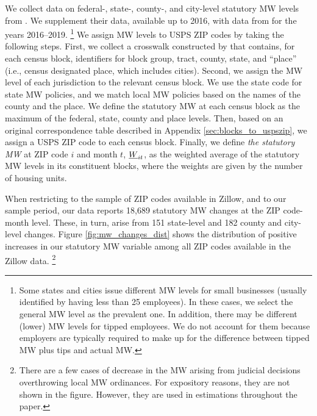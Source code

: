 We collect data on federal-, state-, county-, and city-level statutory MW levels 
from \textcite{VaghulZipperer2016}.
We supplement their data, available up to 2016, with data from 
\textcite{BerkeleyLaborCenter} for the years 2016--2019.%
\footnote{Some states and cities issue different MW levels for small businesses
(usually identified by having less than 25 employees).
In these cases, we select the general MW level as the prevalent one.
In addition, there may be different (lower) MW levels for tipped employees.
We do not account for them because employers are typically required to make up 
for the difference between tipped MW plus tips and actual MW.}
We assign MW levels to USPS ZIP codes by taking the following steps.
First, we collect a crosswalk constructed by \parencite{LODES} that contains,
for each census block, identifiers for block group, tract, county, state,
and ``place'' (i.e., census designated place, which includes cities).
Second, we assign the MW level of each jurisdiction to the relevant census block.
We use the state code for state MW policies, and we match local MW policies 
based on the names of the county and the place.
We define the statutory MW at each census block as the maximum of the federal,
state, county and place levels.
Then, based on an original correspondence table described in Appendix 
\ref{sec:blocks_to_uspszip}, we assign a USPS ZIP code to each census
block.
Finally, we define \textit{the statutory MW} at ZIP code $i$ and month $t$, $\underline{W}_{it}$, 
as the weighted average of the statutory MW levels in its constituent blocks, 
where the weights are given by the number of housing units.

When restricting 
to the sample of ZIP codes available in Zillow, and 
to our sample period, our data reports 
18,689 statutory MW changes at the ZIP code-month level.
These, in turn, arise from 
151 state-level and 
182 county and city-level changes.
%
%
Figure \ref{fig:mw_changes_dist} shows the distribution of positive increases in
our statutory MW variable among all ZIP codes available in the Zillow data.%
\footnote{There are a few cases of decrease in the MW arising from judicial 
decisions overthrowing local MW ordinances.
For expository reasons, they are not shown in the figure.
However, they are used in estimations throughout the paper.}

